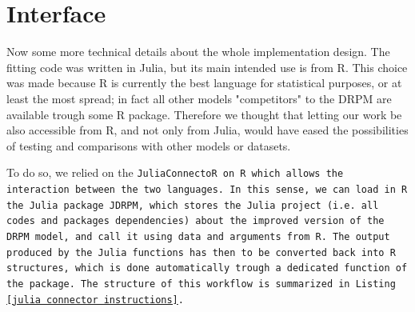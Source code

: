 \documentclass[12pt,	%
	a4paper,		%
	twoside,		%
	openright,		%
	titlepage,%
	]{book}
\theoremstyle{definition}
\begin{document}
\section{Interface}
Now some more technical details about the whole implementation design. The fitting code was written in Julia, but its main intended use is from R. This choice was made because R is currently the best language for statistical purposes, or at least the most spread; in fact all other models "competitors" to the DRPM are available trough some R package. Therefore we thought that letting our work be also accessible from R, and not only from Julia, would have eased the possibilities of testing and comparisons with other models or datasets.

To do so, we relied on the \tt{JuliaConnectoR} on R which allows the interaction between the two languages. In this sense, we can load in R the Julia package \tt{JDRPM}, which stores the Julia project (i.e. all codes and packages dependencies) about the improved version of the DRPM model, and call it using data and arguments from R. The output produced by the Julia functions has then to be converted back into R structures, which is done automatically trough a dedicated function of the package. The structure of this workflow is summarized in Listing \ref{julia connector instructions}.
\end{document}
